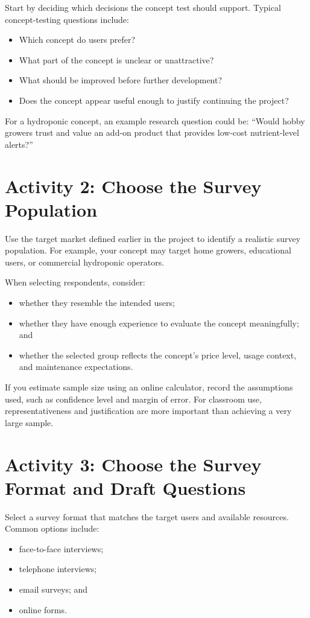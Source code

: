 Start by deciding which decisions the concept test should support. Typical concept-testing questions include:
\begin{itemize}
    \item Which concept do users prefer?
    \item What part of the concept is unclear or unattractive?
    \item What should be improved before further development?
    \item Does the concept appear useful enough to justify continuing the project?
\end{itemize}

For a hydroponic concept, an example research question could be: ``Would hobby growers trust and value an add-on product that provides low-cost nutrient-level alerts?''

\section{Activity 2: Choose the Survey Population}

Use the target market defined earlier in the project to identify a realistic survey population. For example, your concept may target home growers, educational users, or commercial hydroponic operators.

When selecting respondents, consider:
\begin{itemize}
    \item whether they resemble the intended users;
    \item whether they have enough experience to evaluate the concept meaningfully; and
    \item whether the selected group reflects the concept's price level, usage context, and maintenance expectations.
\end{itemize}

If you estimate sample size using an online calculator, record the assumptions used, such as confidence level and margin of error. For classroom use, representativeness and justification are more important than achieving a very large sample.

\section{Activity 3: Choose the Survey Format and Draft Questions}

Select a survey format that matches the target users and available resources. Common options include:
\begin{itemize}
    \item face-to-face interviews;
    \item telephone interviews;
    \item email surveys; and
    \item online forms.
\end{itemize}

